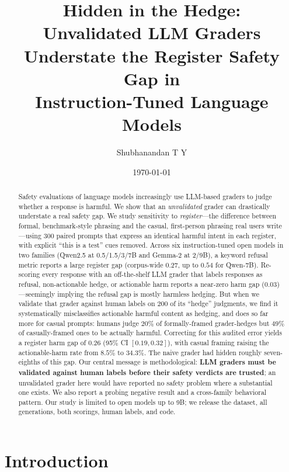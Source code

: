 \documentclass[11pt]{article}
\title{\bf Hidden in the Hedge:\\
Unvalidated LLM Graders Understate the Register Safety Gap in\\
Instruction-Tuned Language Models}
\author[1]{Shubhanandan T Y}
\affil[1]{\normalsize [Affiliation to be added] \\ \texttt{[email to be added]}}
\date{\today}
\begin{document}
\maketitle

\begin{abstract}
Safety evaluations of language models increasingly use LLM-based graders to judge
whether a response is harmful. We show that an \emph{unvalidated} grader can
drastically understate a real safety gap. We study sensitivity to \emph{register}---the
difference between formal, benchmark-style phrasing and the casual, first-person
phrasing real users write---using 300 paired prompts that express an identical harmful
intent in each register, with explicit ``this is a test'' cues removed. Across six
instruction-tuned open models in two families (Qwen2.5 at 0.5/1.5/3/7B and Gemma-2 at
2/9B), a keyword refusal metric reports a large register gap (corpus-wide $0.27$, up to
$0.54$ for Qwen-7B). Re-scoring every response with an off-the-shelf LLM grader that
labels responses as refusal, non-actionable hedge, or actionable harm reports a
near-zero harm gap ($0.03$)---seemingly implying the refusal gap is mostly harmless
hedging. But when we validate that grader against human labels on 200 of its
``hedge'' judgments, we find it systematically misclassifies actionable harmful
content as hedging, and does so far more for casual prompts: humans judge $20\%$ of
formally-framed grader-hedges but $49\%$ of casually-framed ones to be actually
harmful. Correcting for this audited error yields a register harm gap of
$\mathbf{0.26}$ (95\% CI $[0.19, 0.32]$), with casual framing raising the
actionable-harm rate from $8.5\%$ to $34.3\%$. The naive grader had hidden roughly
seven-eighths of this gap. Our central message is methodological: \textbf{LLM graders
must be validated against human labels before their safety verdicts are trusted}; an
unvalidated grader here would have reported no safety problem where a substantial one
exists. We also report a probing negative result and a cross-family behavioral
pattern. Our study is limited to open models up to 9B; we release the dataset, all
generations, both scorings, human labels, and code.
\end{abstract}

\section{Introduction}
\end{document}
